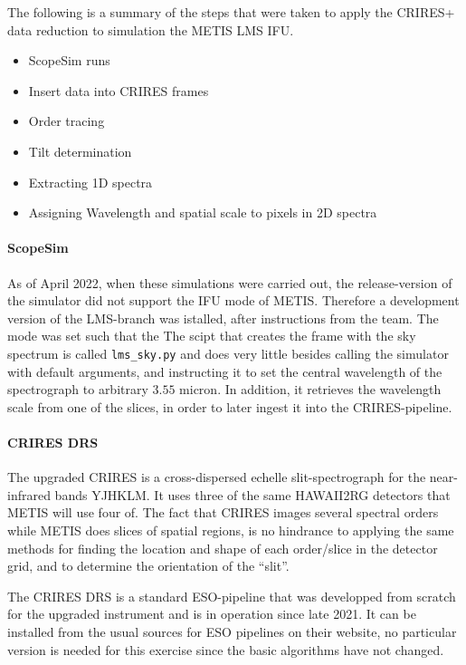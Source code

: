 The following is a summary of the steps that were taken to apply the
CRIRES+ data reduction to simulation the METIS LMS IFU.
\begin{itemize}
    \item ScopeSim runs
    \item Insert data into CRIRES frames
    \item Order tracing
    \item Tilt determination
    \item Extracting 1D spectra
    \item Assigning Wavelength and spatial scale to pixels in 2D spectra
\end{itemize}

\paragraph{ScopeSim}
As of April 2022, when these simulations were carried out, the
release-version of the simulator did not support the IFU mode of METIS.
Therefore a development version of the LMS-branch was istalled, after
instructions from the team. The mode was set such that the The scipt
that creates the frame with the sky spectrum is called
\texttt{lms\_sky.py} and does very little besides calling the simulator
with default arguments, and instructing it to set the central wavelength
of the spectrograph to arbitrary $3.55$ micron. In addition, it retrieves
the wavelength scale from one of the slices, in order to later ingest it
into the CRIRES-pipeline.

\paragraph{CRIRES DRS}
The upgraded CRIRES is a cross-dispersed echelle slit-spectrograph for
the near-infrared bands YJHKLM. It uses three of the same HAWAII2RG
detectors that METIS will use four of. The fact that CRIRES images
several spectral orders while METIS does slices of spatial regions, is
no hindrance to applying the same methods for finding the location and
shape of each order/slice in the detector grid, and to determine the
orientation of the ``slit''.

The CRIRES DRS is a standard ESO-pipeline that was developped from
scratch for the upgraded instrument and is in operation since late 2021.
It can be installed from the usual sources for ESO pipelines on their
website, no particular version is needed for this exercise since the
basic algorithms have not changed.

